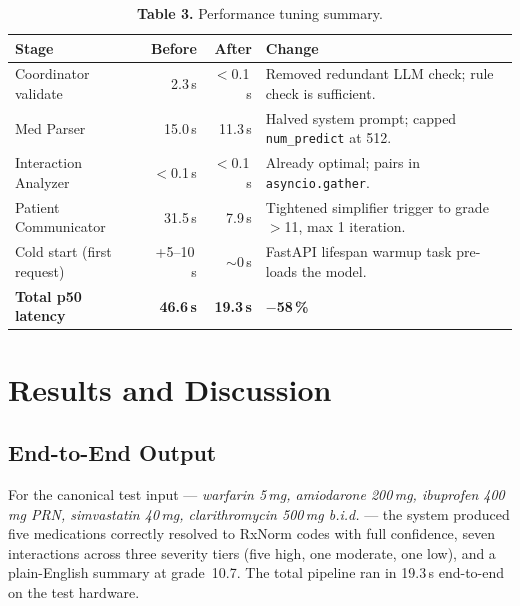 \documentclass[11pt]{article}
\begin{document}
\begin{table}[h]
\centering
\caption*{\small\textbf{Table 3.} Performance tuning summary.}
\renewcommand{\arraystretch}{1.2}
\small
\begin{tabularx}{\linewidth}{l r r Y}
\toprule
\textbf{Stage}                & \textbf{Before} & \textbf{After} & \textbf{Change} \\
\midrule
Coordinator validate          & 2.3\,s          & $<$0.1\,s      & Removed redundant LLM check; rule check is sufficient. \\
Med Parser                    & 15.0\,s         & 11.3\,s        & Halved system prompt; capped \texttt{num\_predict} at 512. \\
Interaction Analyzer          & $<$0.1\,s       & $<$0.1\,s      & Already optimal; pairs in \texttt{asyncio.gather}. \\
Patient Communicator          & 31.5\,s         & 7.9\,s         & Tightened simplifier trigger to grade $>$11, max 1 iteration. \\
Cold start (first request)    & +5--10\,s       & $\sim$0\,s     & FastAPI lifespan warmup task pre-loads the model. \\
\midrule
\textbf{Total p50 latency}    & \textbf{46.6\,s} & \textbf{19.3\,s} & \textbf{$-$58\,\%} \\
\bottomrule
\end{tabularx}
\end{table}

\section*{Results and Discussion}\label{results}

\subsection*{End-to-End Output}

For the canonical test input — \emph{warfarin 5\,mg, amiodarone
200\,mg, ibuprofen 400\,mg PRN, simvastatin 40\,mg, clarithromycin
500\,mg b.i.d.} — the system produced five medications correctly
resolved to RxNorm codes with full confidence, seven interactions
across three severity tiers (five high, one moderate, one low), and a
plain-English summary at grade~10.7. The total pipeline ran in
19.3\,s end-to-end on the test hardware.
\end{document}
